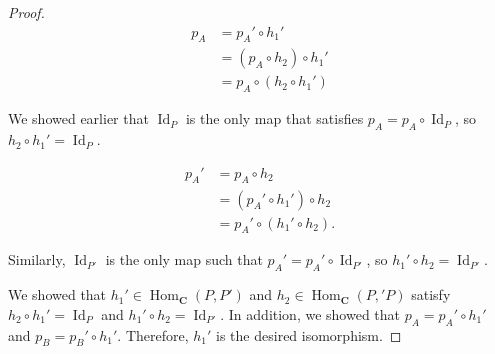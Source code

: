 \documentclass[12pt, psamsfonts]{amsart}
\theoremstyle{definition}
\theoremstyle{remark}
\DeclareMathOperator{\Hom}{Hom}
\DeclareMathOperator{\Id}{Id}
\numberwithin{equation}{section}
\begin{document}
\begin{proof}
  \begin{align*}
    p_A
      &= p_A' \circ h_1' \\
      &= (p_A \circ h_2) \circ h_1' \\
      &= p_A \circ (h_2 \circ h_1')
  \end{align*}

  We showed earlier that $\Id_P$ is the only map that satisfies $p_A = p_A \circ \Id_P$, so $h_2 \circ h_1' = \Id_P$.

  \begin{align*}
    p_A'
      &= p_A \circ h_2 \\
      &= (p_A' \circ h_1') \circ h_2 \\
      &= p_A' \circ (h_1' \circ h_2).
  \end{align*}

  Similarly, $\Id_{P'}$ is the only map such that $p_A' = p_A' \circ \Id_{P'}$, so $h_1' \circ h_2 = \Id_{P'}$.

  We showed that $h_1' \in \Hom_{\mathbf{C}}(P, P')$ and $h_2 \in \Hom_{\mathbf{C}}(P,' P)$ satisfy $h_2 \circ h_1' = \Id_P$ and $h_1' \circ h_2 = \Id_{P'}$.
  In addition, we showed that $p_A = p_A' \circ h_1'$ and $p_B = p_B' \circ h_1'$.
  Therefore, $h_1'$ is the desired isomorphism.
\end{proof}
\end{document}
